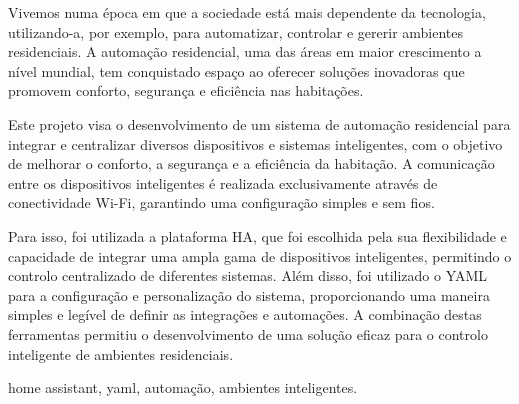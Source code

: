 
Vivemos numa época em que a sociedade está mais dependente da tecnologia, utilizando-a, por exemplo, para automatizar, controlar e gererir ambientes residenciais. A automação residencial, uma das áreas em maior crescimento a nível mundial, tem conquistado espaço ao oferecer soluções inovadoras que promovem conforto, segurança e eficiência nas habitações.

Este projeto visa o desenvolvimento de um sistema de automação residencial para integrar e centralizar diversos dispositivos e sistemas inteligentes, com o objetivo de melhorar o conforto, a segurança e a eficiência da habitação. A comunicação entre os dispositivos inteligentes é realizada exclusivamente através de conectividade Wi-Fi, garantindo uma configuração simples e sem fios.

Para isso, foi utilizada a plataforma \gls{HA}, que foi escolhida pela sua flexibilidade e capacidade de integrar uma ampla gama de dispositivos inteligentes, permitindo o controlo centralizado de diferentes sistemas. Além disso, foi utilizado o \gls{YAML} para a configuração e personalização do sistema, proporcionando uma maneira simples e legível de definir as integrações e automações. A combinação destas ferramentas permitiu o desenvolvimento de uma solução eficaz para o controlo inteligente de ambientes residenciais.


\mbox{}\linebreak
{} home assistant, yaml, automação, ambientes inteligentes.


